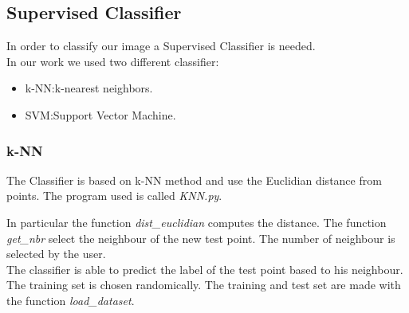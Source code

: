 \documentclass[12pt]{article} %
\begin{document}
\subsection {Supervised Classifier}
In order to classify our image a Supervised Classifier is needed.\\
In our work we used two different classifier:

\begin{itemize}
\item k-NN:k-nearest neighbors.
\item SVM:Support Vector Machine.
\end{itemize}

\subsubsection {k-NN}
The Classifier is based on k-NN method and use the Euclidian distance from points.
The program used is called \textit{KNN.py}.\\
\begin{figure}[H] %
\end{figure}
In particular the function \textit{dist\_euclidian} computes the distance. The function \textit{get\_nbr} select the neighbour of the new test point. The number of neighbour is selected by the user. \\
The classifier is able to predict the label of the test point based to his neighbour. \\
The training set is chosen randomically. The training and test set are made with the function \textit{load\_dataset}.
\end{document}
